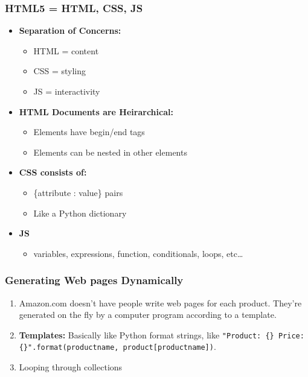 \documentclass{beamer}
\begin{document}
%
%
\begin{frame}[fragile]
  \frametitle{HTML5 = HTML, CSS, JS}
  \pause
  \begin{itemize}
    \item \textbf{Separation of Concerns: }
    \begin{itemize}
      \item HTML = content
      \item CSS = styling
      \item JS = interactivity
    \end{itemize}
    \pause
    \item \textbf{HTML Documents are Heirarchical: }
    \begin{itemize}
      \item Elements have begin/end tags
      \item Elements can be nested in other elements
    \end{itemize}
    \pause
    \item \textbf{CSS consists of:}
    \begin{itemize}
      \item \{attribute : value\} pairs
      \item Like a Python dictionary
    \end{itemize}
    \pause
    \item \textbf{JS}
    \begin{itemize}
      \item variables, expressions, function, conditionals, loops, etc\ldots
    \end{itemize}
  \end{itemize}
\end{frame}
%
%
\begin{frame}[fragile]
  \frametitle{Generating Web pages Dynamically}
  \begin{enumerate}[A]
    \item Amazon.com doesn't have people write web pages for each product. They're generated on the fly by a computer program according to a template.
    \item \textbf{Templates: } Basically like Python format strings, like \lstinline|"Product: {} Price: {}".format(productname, product[productname])|.
    \item Looping through collections
  \end{enumerate}
\end{frame}
\end{document}
